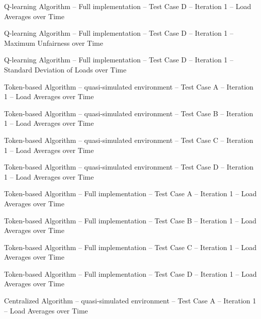    {Q-learning Algorithm -- Full implementation -- Test Case D --
   Iteration 1 -- Load Averages over Time}

   {Q-learning Algorithm -- Full implementation -- Test Case D --
   Iteration 1 -- Maximum Unfairness over Time}

   {Q-learning Algorithm -- Full implementation -- Test Case D --
   Iteration 1 -- Standard Deviation of Loads over Time}

   {Token-based Algorithm -- quasi-simulated environment -- Test Case A --
   Iteration 1 -- Load Averages over Time}

   {Token-based Algorithm -- quasi-simulated environment -- Test Case B --
   Iteration 1 -- Load Averages over Time}

   {Token-based Algorithm -- quasi-simulated environment -- Test Case C --
   Iteration 1 -- Load Averages over Time}

   {Token-based Algorithm -- quasi-simulated environment -- Test Case D --
   Iteration 1 -- Load Averages over Time}

   {Token-based Algorithm -- Full implementation -- Test Case A --
   Iteration 1 -- Load Averages over Time}

   {Token-based Algorithm -- Full implementation -- Test Case B --
   Iteration 1 -- Load Averages over Time}

   {Token-based Algorithm -- Full implementation -- Test Case C --
   Iteration 1 -- Load Averages over Time}

   {Token-based Algorithm -- Full implementation -- Test Case D --
   Iteration 1 -- Load Averages over Time}

   {Centralized Algorithm -- quasi-simulated environment -- Test Case A --
   Iteration 1 -- Load Averages over Time}

